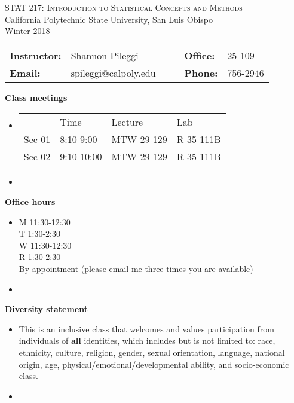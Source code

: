 \documentclass[letterpaper,12pt]{report}
\begin{document}
\begin{center}
\large{\textsc{STAT 217: Introduction to Statistical Concepts and Methods}}\\
California Polytechnic State University, San Luis Obispo\\
Winter 2018\\
\end{center}
\vskip10pt
\begin{center}
{\renewcommand{\arraystretch}{1.5}
\begin{tabular}{llllll}
\hline
\textbf{Instructor:} & Shannon Pileggi       &&& \textbf{Office:} & 25-109 \\
\textbf{Email:}      & spileggi@calpoly.edu  &&& \textbf{Phone:} & 756-2946 \\
\hline
\end{tabular}}
\end{center}

\vskip15pt

\textbf{Class meetings}
\begin{itemize}
\item[]
\begin{tabular}{llll}
       & Time       & Lecture &  Lab \\
Sec 01 & 8:10-9:00  & MTW 29-129 & R 35-111B \\
Sec 02 & 9:10-10:00 & MTW 29-129 & R 35-111B \\
\end{tabular}
\item[]
\end{itemize}

\textbf{Office hours}
\begin{itemize}
\item[] M 11:30-12:30 \\ T \hspace{0.1ex} 1:30-2:30 \\ W 11:30-12:30 \\ R \hspace{0.1ex} 1:30-2:30 \\ By appointment (please email me three times you are available)
\item[]
\end{itemize}

\textbf{Diversity statement}
\begin{itemize}
\item[] This is an inclusive class that welcomes and values participation from individuals of \textbf{all} identities, which includes but is not limited to: race, ethnicity, culture, religion, gender, sexual orientation, language, national origin, age, physical/emotional/developmental ability, and socio-economic class.
\item[]
\end{itemize}
\end{document}
